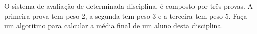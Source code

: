 
\question[10]

O sistema de avaliação de determinada disciplina, é composto por três provas. A primeira prova tem peso 2, a segunda tem peso 3 e a terceira tem peso 5. Faça um algoritmo para calcular a média final de um aluno desta disciplina.


